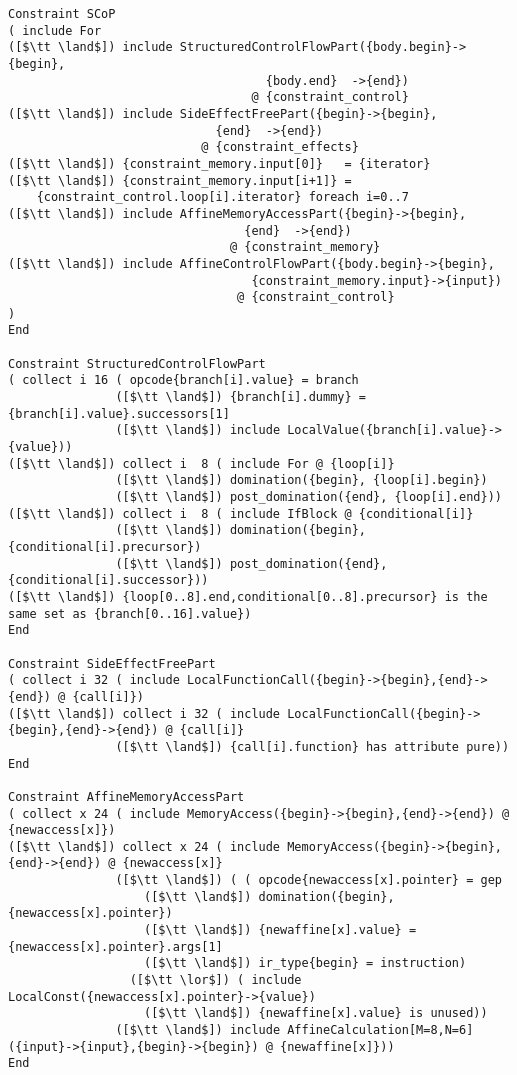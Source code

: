 \begin{lstlisting}[language=CAnDL]
Constraint SCoP
( include For
([$\tt \land$]) include StructuredControlFlowPart({body.begin}->{begin},
                                    {body.end}  ->{end})
                                  @ {constraint_control}
([$\tt \land$]) include SideEffectFreePart({begin}->{begin},
                             {end}  ->{end})
                           @ {constraint_effects}
([$\tt \land$]) {constraint_memory.input[0]}   = {iterator}
([$\tt \land$]) {constraint_memory.input[i+1]} =
    {constraint_control.loop[i].iterator} foreach i=0..7
([$\tt \land$]) include AffineMemoryAccessPart({begin}->{begin},
                                 {end}  ->{end})
                               @ {constraint_memory}
([$\tt \land$]) include AffineControlFlowPart({body.begin}->{begin},
                                  {constraint_memory.input}->{input})
                                @ {constraint_control}
)
End

Constraint StructuredControlFlowPart
( collect i 16 ( opcode{branch[i].value} = branch
               ([$\tt \land$]) {branch[i].dummy} = {branch[i].value}.successors[1]
               ([$\tt \land$]) include LocalValue({branch[i].value}->{value}))
([$\tt \land$]) collect i  8 ( include For @ {loop[i]}
               ([$\tt \land$]) domination({begin}, {loop[i].begin})
               ([$\tt \land$]) post_domination({end}, {loop[i].end}))
([$\tt \land$]) collect i  8 ( include IfBlock @ {conditional[i]}
               ([$\tt \land$]) domination({begin}, {conditional[i].precursor})
               ([$\tt \land$]) post_domination({end}, {conditional[i].successor}))
([$\tt \land$]) {loop[0..8].end,conditional[0..8].precursor} is the same set as {branch[0..16].value})
End

Constraint SideEffectFreePart
( collect i 32 ( include LocalFunctionCall({begin}->{begin},{end}->{end}) @ {call[i]}) 
([$\tt \land$]) collect i 32 ( include LocalFunctionCall({begin}->{begin},{end}->{end}) @ {call[i]}
               ([$\tt \land$]) {call[i].function} has attribute pure))
End

Constraint AffineMemoryAccessPart
( collect x 24 ( include MemoryAccess({begin}->{begin},{end}->{end}) @ {newaccess[x]})
([$\tt \land$]) collect x 24 ( include MemoryAccess({begin}->{begin},{end}->{end}) @ {newaccess[x]}
               ([$\tt \land$]) ( ( opcode{newaccess[x].pointer} = gep
                   ([$\tt \land$]) domination({begin}, {newaccess[x].pointer})
                   ([$\tt \land$]) {newaffine[x].value} = {newaccess[x].pointer}.args[1]
                   ([$\tt \land$]) ir_type{begin} = instruction)
                 ([$\tt \lor$]) ( include LocalConst({newaccess[x].pointer}->{value})
                   ([$\tt \land$]) {newaffine[x].value} is unused))
               ([$\tt \land$]) include AffineCalculation[M=8,N=6]({input}->{input},{begin}->{begin}) @ {newaffine[x]}))
End


\end{lstlisting}
